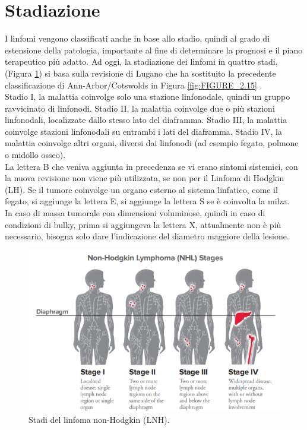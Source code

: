\section{Stadiazione}
I linfomi vengono classificati anche in base allo stadio, quindi al grado di estensione della patologia, 
importante al fine di determinare la prognosi e il piano terapeutico più adatto. 
Ad oggi, la stadiazione dei linfomi in quattro stadi, (Figura \ref{fig:FIGURE_2.14}) si basa sulla revisione di 
Lugano che ha sostituito la precedente classificazione di Ann-Arbor/Cotswolds in Figura \ref{fig:FIGURE_2.15} \cite{AIOM}.\\
Stadio I, la malattia coinvolge solo una stazione linfonodale, quindi un gruppo ravvicinato di linfonodi. 
Stadio II, la malattia coinvolge due o più stazioni linfonodali, localizzate dallo stesso lato del diaframma. 
Stadio III, la malattia coinvolge stazioni linfonodali su entrambi i lati del diaframma. 
Stadio IV, la malattia coinvolge altri organi, diversi dai linfonodi (ad esempio fegato, polmone o midollo osseo)\cite{LLS}.\\
La lettera B che veniva aggiunta in precedenza se vi erano sintomi sistemici, con la nuova revisione non viene 
più utilizzata, se non per il Linfoma di Hodgkin (LH)\cite{AIOM}.
Se il tumore coinvolge un organo esterno al sistema linfatico, come il fegato, si aggiunge la lettera E, 
si aggiunge la lettera S se è coinvolta la milza\cite{ISTGENT}.\\
In caso di massa tumorale con dimensioni voluminose, quindi in caso di condizioni di bulky, 
prima si aggiungeva la lettera X, attualmente non è più necessario, 
bisogna solo dare l’indicazione del diametro maggiore della lesione\cite{AIOM}.\\ 

\begin{figure}[H]
    \begin{center}
    \includegraphics[width=0.85\columnwidth]{img/nhlstages.png}
    \vspace{-3mm}
    \end{center}
    \caption{Stadi del linfoma non-Hodgkin (LNH).
    \cite{LLS}}
    \label{fig:FIGURE_2.14}
\end{figure}

